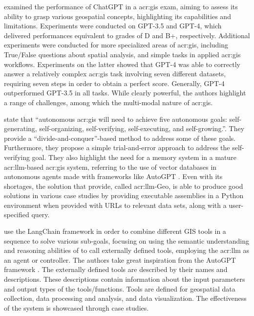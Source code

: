 \cite{mooneyUnderstandingGeospatialSkills2023} examined the performance of ChatGPT in a \acrfull{acr:gis} exam, aiming to assess its ability to grasp various geospatial concepts, highlighting its capabilities and limitations. Experiments were conducted on GPT-3.5 and GPT-4, which delivered performances equivalent to grades of D and B+, respectively. Additional experiments were conducted for more specialized areas of \acrshort{acr:gis}, including True/False questions about spatial analysis, and simple tasks in applied \acrshort{acr:gis} workflows. Experiments on the latter showed that GPT-4 was able to correctly answer a relatively complex \acrshort{acr:gis} task involving seven different datasets, requiring seven steps in order to obtain a perfect score. Generally, GPT-4 outperformed GPT-3.5 in all tasks. While clearly powerful, the authors highlight a range of challenges, among which the multi-modal nature of \acrshort{acr:gis}.

\cite{liAutonomousGISNextgeneration2023} state that \enquote{autonomous \acrshort{acr:gis} will need to achieve five autonomous goals: self-generating, self-organizing, self-verifying, self-executing, and self-growing.}. They provide a \enquote{divide-and-conquer}-based method to address some of these goals. Furthermore, they propose a simple trial-and-error approach to address the self-verifying goal. They also highlight the need for a memory system in a mature \acrshort{acr:llm}-based \acrshort{acr:gis} system, referring to the use of vector databases in autonomous agents made with frameworks like AutoGPT \citep{richardAutoGPTHeartOpensource2023}. Even with its shortages, the solution that \cite{liAutonomousGISNextgeneration2023} provide, called \acrshort{acr:llm}-Geo, is able to produce good solutions in various case studies by providing executable assemblies in a Python environment when provided with URLs to relevant data sets, along with a user-specified query.

\cite{zhangGeoGPTUnderstandingProcessing2023} use the LangChain framework in order to combine different GIS tools in a sequence to solve various sub-goals, focusing on using the semantic understanding and reasoning abilities of  to call externally defined tools, employing the \acrshort{acr:llm} as an agent or controller. The authors take great inspiration from the AutoGPT framework \citep{richardAutoGPTHeartOpensource2023}. The externally defined tools are described by their names and descriptions. These descriptions contain information about the input parameters and output types of the tools/functions. Tools are defined for geospatial data collection, data processing and analysis, and data visualization. The effectiveness of the system is showcased through case studies.


